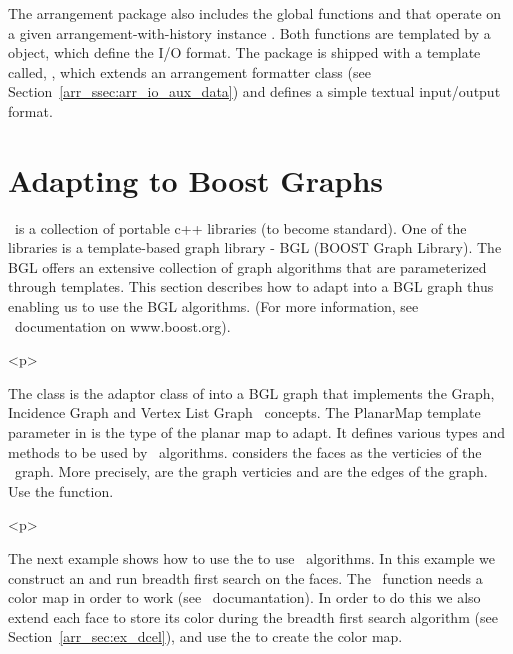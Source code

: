 
\begin{ccAdvanced}
The arrangement package also includes the global functions
 and  that
operate on a given arrangement-with-history instance .
Both functions are templated by a  object, which define
the I/O format. The package is shipped with a template called,
, which extends
an arrangement formatter class (see Section~\ref{arr_ssec:arr_io_aux_data})
and defines a simple textual input/output format.
\end{ccAdvanced}

\section{Adapting to {\sc Boost} Graphs}
\label{arr_sec:bgl}
%
\boost\ is a collection of portable c++ libraries (to become standard). 
One of the libraries is a template-based graph library - BGL (BOOST Graph 
Library). The BGL offers an extensive collection of graph algorithms 
that are parameterized through templates. This section describes how to 
adapt  into a BGL graph thus enabling us to use the 
BGL algorithms. (For more information, see \boost\ documentation on 
www.boost.org).

\begin{ccHtmlOnly}<p>\end{ccHtmlOnly}
The class  is the adaptor class of 
 into a BGL graph that implements the Graph, Incidence Graph 
and Vertex List Graph \boost\ concepts. The PlanarMap template parameter in 
 is the type of the planar map to adapt. 
It defines various types and methods to be used by \boost\ algorithms. 
 considers the  faces as 
the verticies of the \boost\ graph. More precisely, 
 are the graph verticies and 
 are the edges of the graph.
Use the  function.

\begin{ccHtmlOnly}<p>\end{ccHtmlOnly}
The next example shows how to use the  to use 
\boost\ algorithms. In this example we construct an  and 
run breadth first search on the faces. The  
\boost\ function needs a color map in order to work (see 
\boost\ documantation). In order to do this we also extend each face to store 
its color during the breadth first search algorithm (see 
Section~\ref{arr_sec:ex_dcel}), and use the  to create 
the color map.

